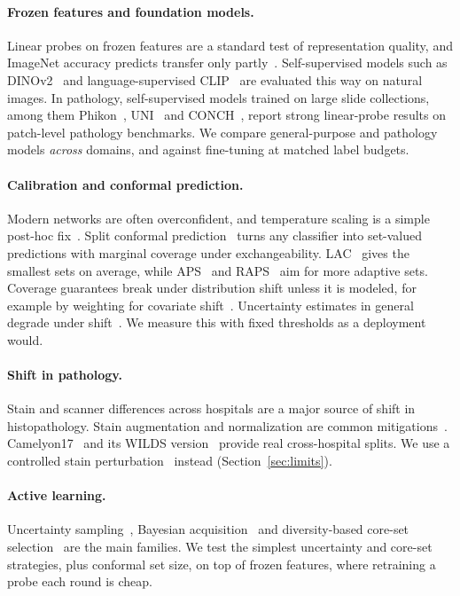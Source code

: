\documentclass[10pt,twocolumn]{article}
\begin{document}
\paragraph{Frozen features and foundation models.} Linear probes on frozen features are a
standard test of representation quality, and ImageNet accuracy predicts transfer only
partly~\cite{kornblith2019}. Self-supervised models such as DINOv2~\cite{oquab2023} and
language-supervised CLIP~\cite{radford2021} are evaluated this way on natural images. In
pathology, self-supervised models trained on large slide collections, among them
Phikon~\cite{filiot2023}, UNI~\cite{chen2024} and CONCH~\cite{lu2024}, report strong linear-probe
results on patch-level pathology benchmarks. We compare general-purpose and pathology models
\emph{across} domains, and against fine-tuning at matched label budgets.

\paragraph{Calibration and conformal prediction.} Modern networks are often overconfident, and
temperature scaling is a simple post-hoc fix~\cite{guo2017}. Split conformal
prediction~\cite{vovk2005,angelopoulos2021} turns any classifier into set-valued predictions with
marginal coverage under exchangeability. LAC~\cite{sadinle2019} gives the smallest sets on
average, while APS~\cite{romano2020} and RAPS~\cite{angelopoulos2021raps} aim for more adaptive
sets. Coverage guarantees break under distribution shift unless it is modeled, for example by
weighting for covariate shift~\cite{tibshirani2019}. Uncertainty estimates in general degrade
under shift~\cite{ovadia2019}. We measure this with fixed thresholds as a deployment would.

\paragraph{Shift in pathology.} Stain and scanner differences across hospitals are a major
source of shift in histopathology. Stain augmentation and normalization are common
mitigations~\cite{tellez2019}. Camelyon17~\cite{bandi2019} and its WILDS version~\cite{koh2021}
provide real cross-hospital splits. We use a controlled stain perturbation~\cite{ruifrok2001}
instead (Section~\ref{sec:limits}).

\paragraph{Active learning.} Uncertainty sampling~\cite{settles2009}, Bayesian
acquisition~\cite{gal2017} and diversity-based core-set selection~\cite{sener2018} are the main
families. We test the simplest uncertainty and core-set strategies, plus conformal set size, on
top of frozen features, where retraining a probe each round is cheap.
\end{document}

